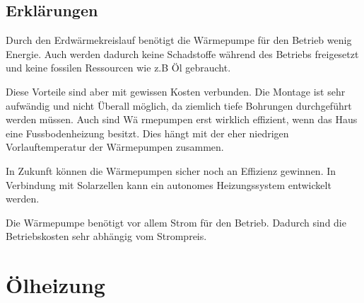 \subsection{Erklärungen}

Durch den Erdwärmekreislauf benötigt die Wärmepumpe für den Betrieb wenig Energie. Auch werden dadurch keine Schadstoffe während des Betriebs freigesetzt und keine fossilen Ressourcen wie z.B Öl gebraucht.

Diese Vorteile sind aber mit gewissen Kosten verbunden. Die Montage ist sehr aufwändig und nicht Überall möglich, da ziemlich tiefe Bohrungen durchgeführt werden müssen. Auch sind Wä
rmepumpen erst wirklich effizient, wenn das Haus eine Fussbodenheizung besitzt. Dies hängt mit der eher niedrigen Vorlauftemperatur der Wärmepumpen zusammen.

In Zukunft können die Wärmepumpen sicher noch an Effizienz gewinnen. In Verbindung mit Solarzellen kann ein autonomes Heizungssystem entwickelt werden.

Die Wärmepumpe benötigt vor allem Strom für den Betrieb. Dadurch sind die Betriebskosten sehr abhängig vom Strompreis. 


\section{Ölheizung}

